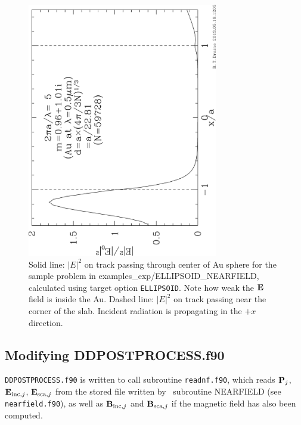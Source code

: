 \begin{figure}[h]
\begin{center}
\vspace*{-0.1cm}
\includegraphics[width=8.3cm,angle=270]{f_ellipsoid_nf.png}
\vspace*{-0.4cm}
\caption{\label{fig:E_ellipsoid_nf}
         \footnotesize
         Solid line: $|E|^2$ on track passing through center of Au sphere for
         the sample problem in examples\_exp/ELLIPSOID\_NEARFIELD,
         calculated using target option {\tt ELLIPSOID}.
         Note how weak the ${\bf E}$ field is inside the Au.
         Dashed line: $|E|^2$ on track passing near the corner of
         the slab.
         Incident radiation is propagating in the $+x$ direction.
}
\end{center}
\end{figure}

\subsection{Modifying DDPOSTPROCESS.f90}

{\tt DDPOSTPROCESS.f90} is written to call subroutine {\tt readnf.f90}, which
reads ${\bf P}_j$, ${\bf E}_{{\rm inc},j}$, 
${\bf E}_{{\rm sca},j}$
from the stored file written by \ddscatv\ subroutine NEARFIELD
(see {\tt nearfield.f90}), as well as ${\bf B}_{{\rm inc},j}$ and ${\bf B}_{{\rm sca},j}$ if the
magnetic field has also been computed.

